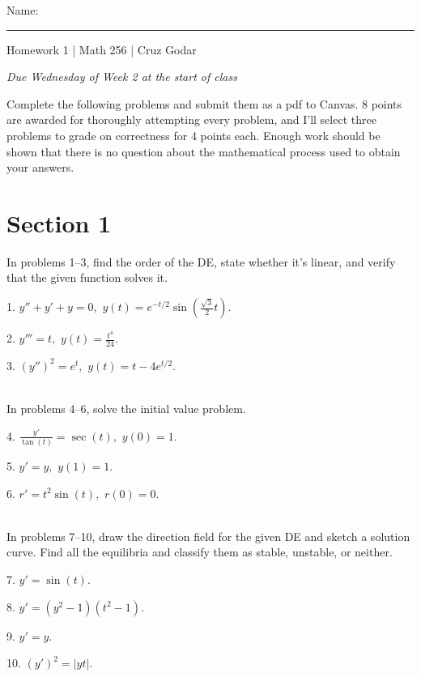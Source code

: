 \documentclass{article}
\begin{document}
\Large Name: \rule{2in}{0.15mm} \hfill Homework 1 | Math 256 | Cruz Godar \vspace{4pt} \normalsize

\textit{Due Wednesday of Week 2 at the start of class}

Complete the following problems and submit them as a pdf to Canvas. 8 points are awarded for thoroughly attempting every problem, and I'll select three problems to grade on correctness for 4 points each. Enough work should be shown that there is no question about the mathematical process used to obtain your answers.

\section{Section 1}

In problems 1--3, find the order of the DE, state whether it's linear, and verify that the given function solves it.

1. $\displaystyle y'' + y' + y = 0,$ $\displaystyle y(t) = e^{-t / 2}\sin\left( \frac{\sqrt{3}}{2} t \right).$

2. $\displaystyle y''' = t,$ $\displaystyle y(t) = \frac{t^4}{24}.$

3. $\displaystyle (y'')^2 = e^t,$ $\displaystyle y(t) = t - 4e^{t / 2}.$

~\\

In problems 4--6, solve the initial value problem.

4. $\displaystyle \frac{y'}{\tan(t)} = \sec(t),$ $\displaystyle y(0) = 1.$

5. $\displaystyle y' = y,$ $\displaystyle y(1) = 1.$

6. $\displaystyle r' = t^2\sin(t),$ $\displaystyle r(0) = 0.$

~\\

In problems 7--10, draw the direction field for the given DE and sketch a solution curve. Find all the equilibria and classify them as stable, unstable, or neither.

7. $\displaystyle y' = \sin(t).$

8. $\displaystyle y' = (y^2 - 1)(t^2 - 1).$

9. $\displaystyle y' = y.$

10. $\displaystyle (y')^2 = |yt|.$
\end{document}
